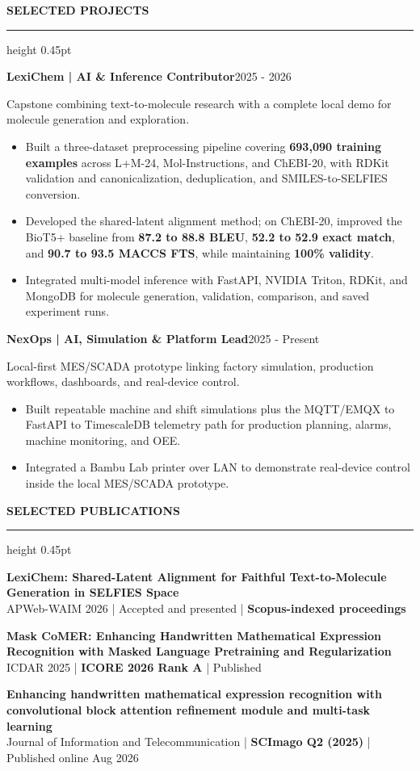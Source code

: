 \documentclass[10pt]{article}
\newcommand{\cvsection}[1]{%
    \vspace{6.2pt}%
    {\color{accent}\bfseries\small #1}\par
    \vspace{2.3pt}%
    {\color{rulegray}\hrule height 0.45pt}\vspace{4.0pt}%
}
\newcommand{\entry}[2]{%
    \textbf{#1}\hfill {\color{muted}\small #2}\par
}
\newcommand{\subentry}[1]{%
    {\color{muted}\small #1}\par
}
\begin{document}
\cvsection{SELECTED PROJECTS}
\entry{LexiChem | AI \& Inference Contributor}{2025 - 2026}
\subentry{Capstone combining text-to-molecule research with a complete local demo for molecule generation and exploration.}
\begin{itemize}
    \item Built a three-dataset preprocessing pipeline covering \textbf{693,090 training examples} across L+M-24, Mol-Instructions, and ChEBI-20, with RDKit validation and canonicalization, deduplication, and SMILES-to-SELFIES conversion.
    \item Developed the shared-latent alignment method; on ChEBI-20, improved the BioT5+ baseline from \textbf{87.2 to 88.8 BLEU}, \textbf{52.2 to 52.9 exact match}, and \textbf{90.7 to 93.5 MACCS FTS}, while maintaining \textbf{100\% validity}.
    \item Integrated multi-model inference with FastAPI, NVIDIA Triton, RDKit, and MongoDB for molecule generation, validation, comparison, and saved experiment runs.
\end{itemize}

\entry{NexOps | AI, Simulation \& Platform Lead}{2025 - Present}
\subentry{Local-first MES/SCADA prototype linking factory simulation, production workflows, dashboards, and real-device control.}
\begin{itemize}
    \item Built repeatable machine and shift simulations plus the MQTT/EMQX to FastAPI to TimescaleDB telemetry path for production planning, alarms, machine monitoring, and OEE.
    \item Integrated a Bambu Lab printer over LAN to demonstrate real-device control inside the local MES/SCADA prototype.
\end{itemize}

\cvsection{SELECTED PUBLICATIONS}
\textbf{LexiChem: Shared-Latent Alignment for Faithful Text-to-Molecule Generation in SELFIES Space}\\[-1pt]
{\small APWeb-WAIM 2026 | Accepted and presented | \textbf{Scopus-indexed proceedings}}\par
\vspace{2.2pt}
\textbf{Mask CoMER: Enhancing Handwritten Mathematical Expression Recognition with Masked Language Pretraining and Regularization}\\[-1pt]
{\small ICDAR 2025 | \textbf{ICORE 2026 Rank A} | Published}\par
\vspace{2.2pt}
\textbf{Enhancing handwritten mathematical expression recognition with convolutional block attention refinement module and multi-task learning}\\[-1pt]
{\small Journal of Information and Telecommunication | \textbf{SCImago Q2 (2025)} | Published online Aug 2026}
\end{document}
